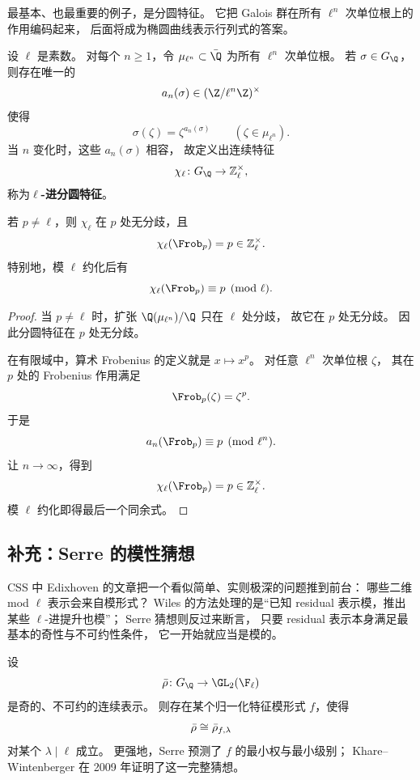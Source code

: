 最基本、也最重要的例子，是分圆特征。
它把 Galois 群在所有 $\ell^n$ 次单位根上的作用编码起来，
后面将成为椭圆曲线表示行列式的答案。

\begin{definition}
设 $\ell$ 是素数。
对每个 $n\ge 1$，令 $\mu_{\ell^n}\subset \bar\Q$ 为所有 $\ell^n$ 次单位根。
若 $\sigma\in G_\Q$，则存在唯一的
\[
  a_n(\sigma)\in (\Z/\ell^n\Z)^\times
\]
使得
\[
  \sigma(\zeta)=\zeta^{a_n(\sigma)}
  \qquad (\zeta\in \mu_{\ell^n}).
\]
当 $n$ 变化时，这些 $a_n(\sigma)$ 相容，
故定义出连续特征
\[
  \chi_\ell\colon G_\Q\to \Zl^\times,
\]
称为\textbf{$\ell$-进分圆特征}。
\end{definition}

\begin{proposition}
\label{prop:ch09-cyclotomic-frobenius}
若 $p\neq \ell$，则 $\chi_\ell$ 在 $p$ 处无分歧，且
\[
  \chi_\ell(\Frob_p)=p\in \Zl^\times.
\]
特别地，模 $\ell$ 约化后有
\[
  \chi_\ell(\Frob_p)\equiv p\pmod \ell.
\]
\end{proposition}

\begin{proof}
当 $p\neq \ell$ 时，扩张 $\Q(\mu_{\ell^n})/\Q$ 只在 $\ell$ 处分歧，
故它在 $p$ 处无分歧。
因此分圆特征在 $p$ 处无分歧。

在有限域中，算术 Frobenius 的定义就是 $x\mapsto x^p$。
对任意 $\ell^n$ 次单位根 $\zeta$，
其在 $p$ 处的 Frobenius 作用满足
\[
  \Frob_p(\zeta)=\zeta^p.
\]
于是
\[
  a_n(\Frob_p)\equiv p\pmod{\ell^n}.
\]
让 $n\to \infty$，得到
\[
  \chi_\ell(\Frob_p)=p\in \Zl^\times.
\]
模 $\ell$ 约化即得最后一个同余式。
\end{proof}

\subsection*{补充：Serre 的模性猜想}
CSS 中 Edixhoven 的文章把一个看似简单、实则极深的问题推到前台：
哪些二维 mod $\ell$ 表示会来自模形式？
Wiles 的方法处理的是“已知 residual 表示模，推出某些 $\ell$-进提升也模”；
Serre 猜想则反过来断言，
只要 residual 表示本身满足最基本的奇性与不可约性条件，
它一开始就应当是模的。

\begin{theorem}
\label{thm:ch09-serre-conjecture}
设
\[
  \rhobar\colon G_\Q\to \GL_2(\F_\ell)
\]
是奇的、不可约的连续表示。
则存在某个归一化特征模形式 $f$，使得
\[
  \bar{\rho}\cong \bar{\rho}_{f,\lambda}
\]
对某个 $\lambda\mid \ell$ 成立。
更强地，Serre 预测了 $f$ 的最小权与最小级别；
Khare--Wintenberger 在 2009 年证明了这一完整猜想。
\end{theorem}

